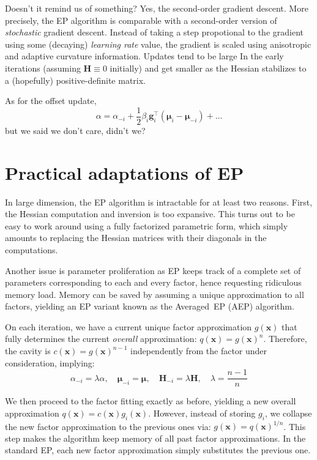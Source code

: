 \documentclass{article}
\def\x{{\mathbf{x}}}
\def\m{{\boldsymbol{\mu}}}
\def\H{\mathbf{H}}
\def\g{\mathbf{g}}
\begin{document}
Doesn't it remind us of something? Yes, the second-order gradient descent. More precisely, the EP algorithm is comparable with a second-order version of {\em stochastic} gradient descent. Instead of taking a step propotional to the gradient using some (decaying) {\em learning rate} value, the gradient is scaled using anisotropic and adaptive curvature information. Updates tend to be large In the early iterations (assuming $\H\equiv 0$ initially) and get smaller as the Hessian stabilizes to a (hopefully) positive-definite matrix.

As for the offset update,
$$
\alpha = \alpha_{-i} + \frac{1}{2} \beta_i \g_i^\top(\m_i-\m_{-i}) + \ldots
$$
but we said we don't care, didn't we?

\section{Practical adaptations of EP}
\label{sec:practical_ep}

In large dimension, the EP algorithm is intractable for at least two reasons. First, the Hessian computation and inversion is too expansive. This turns out to be easy to work around using a fully factorized parametric form, which simply amounts to replacing the Hessian matrices with their diagonals in the computations. 

Another issue is parameter proliferation as EP keeps track of a complete set of parameters corresponding to each and every factor, hence requesting ridiculous memory load. Memory can be saved by assuming a unique approximation to all factors, yielding an EP variant known as the Averaged~EP (AEP) algorithm. 

On each iteration, we have a current unique factor approximation $g(\x)$ that fully determines the current {\em overall} approximation: $q(\x)=g(\x)^n$. Therefore, the cavity is $c(\x)=g(\x)^{n-1}$ independently from the factor under consideration, implying:
$$
\alpha_{-i} = \lambda \alpha,
\quad
\m_{-i} = \m,
\quad
\H_{-i} = \lambda \H,
\quad 
\lambda = \frac{n-1}{n}
$$

We then proceed to the factor fitting exactly as before, yielding a new overall approximation $q(\x)=c(\x)g_i(\x)$. However, instead of storing $g_i$, we collapse the new factor approximation to the previous ones via: $g(\x)=q(\x)^{1/n}$. This step makes the algorithm keep memory of all past factor approximations. In the standard EP, each new factor approximation simply substitutes the previous one. 
\end{document}
